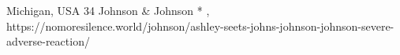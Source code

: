           {
            Michigan, USA
          }
          {
            34
          }
          {
            Johnson \& Johnson
          }
          {
            *
          }
          {
            ,
          }
          {
            https://nomoresilence.world/johnson/ashley-seets-johns-johnson-johnson-severe-adverse-reaction/
          }

